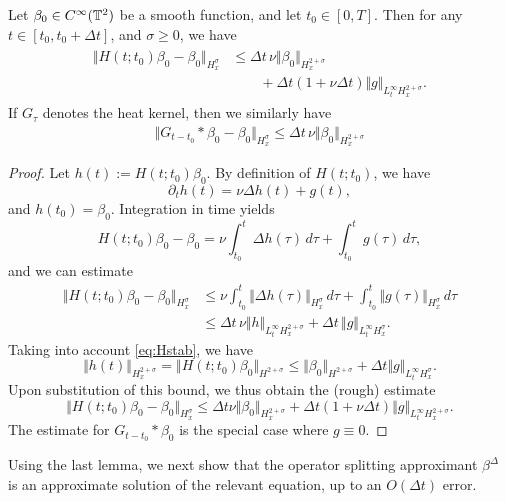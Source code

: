 \documentclass[reqno,12pt]{amsart}
\begin{document}
\begin{lemma}
\label{lem:Hid}
Let $\beta_0\in C^\infty(\mathbb{T}^2)$ be a smooth function, and let $t_0\in [0,T]$. Then for any $t\in [t_0, t_0+\Delta t]$, and $\sigma \ge 0$, we have
\begin{align}
\label{eq:Hid}
\begin{aligned}
\Vert H(t;t_0) \beta_0 - \beta_0 \Vert_{H^\sigma_x}
&\le
\Delta t \, \nu \Vert \beta_0 \Vert_{H_x^{2+\sigma}}
\\
&\qquad
+
\Delta t (1+\nu \Delta t) \Vert g \Vert_{L^\infty_t H_x^{2+\sigma}}.
\end{aligned}
\end{align}
If $G_\tau$ denotes the heat kernel, then we similarly have
\begin{align}
\label{eq:Gid}
\Vert G_{t-t_0} \ast \beta_0 - \beta_0 \Vert_{H^\sigma_x}
\le
\Delta t \, \nu \Vert \beta_0 \Vert_{H_x^{2+\sigma}}
\end{align}
\end{lemma}

\begin{proof}
Let $h(t) := H(t;t_0)\beta_0$. By definition of $H(t;t_0)$, we have
\[
\partial_{t} h(t) = \nu \Delta h(t) + g(t),
\]
and $h(t_0) = \beta_0$. Integration in time yields
\[
 H(t;t_0) \beta_0 - \beta_0
 =
  \nu \int_{t_0}^{t}\Delta h(\tau) \, d\tau
 +
 \int_{t_0}^{t} g(\tau) \, d\tau,
\]
and we can estimate
\begin{align*}
\Vert H(t;t_0) \beta_0 - \beta_0 \Vert_{H^\sigma_x}
&\le
 \nu \int_{t_0}^{t} \Vert \Delta h(\tau) \Vert_{H^\sigma_x} \, d\tau
 +
 \int_{t_0}^{t} \Vert  g(\tau) \Vert_{H^\sigma_x} \, d\tau
 \\
 &\le
 \Delta t\, \nu  \Vert h \Vert_{L^\infty_t H_x^{2+\sigma}}
 +
 \Delta t\, \Vert  g\Vert_{L^\infty_t H_x^\sigma}.
\end{align*}
Taking into account \eqref{eq:Hstab}, we have
\[
\Vert h(t) \Vert_{H^{2+\sigma}_x}
=
\Vert H(t;t_0) \beta_0 \Vert_{H^{2+\sigma}}
\le
\Vert \beta_0 \Vert_{H^{2+\sigma}} + \Delta t \Vert g \Vert_{L^\infty_t H^\sigma_x}.
\]
Upon substitution of this bound, we thus obtain the (rough) estimate
\[
\Vert H(t;t_0) \beta_0 - \beta_0 \Vert_{H^\sigma_x}
\le
\Delta t \nu \Vert \beta_0 \Vert_{H_x^{2+\sigma}}
+
\Delta t (1+\nu \Delta t) \Vert g \Vert_{L^\infty_t H_x^{2+\sigma}}.
\]
The estimate for $G_{t-t_0}\ast \beta_0$ is the special case where $g\equiv 0$.
\end{proof}

Using the last lemma, we next show that the operator splitting approximant ${\beta}^\Delta$ is an approximate solution of the relevant equation, up to an $O(\Delta t)$ error.
\end{document}
